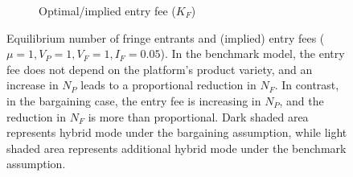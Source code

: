 \begin{figure}
\begin{subfigure}[b]{0.45\textwidth}
        \caption{Optimal/implied entry fee ($K_F$)}
        \label{fig:entry_fee}
    \end{subfigure}
    \caption{Equilibrium number of fringe entrants and (implied) entry fees ($\mu = 1, V_P = 1, V_F = 1, I_F = 0.05$). In the benchmark model, the entry fee does not depend on the platform's product variety, and an increase in $N_P$ leads to a proportional reduction in $N_F$. In contrast, in the bargaining case, the entry fee is increasing in $N_P$, and the reduction in $N_F$ is more than proportional. Dark shaded area represents hybrid mode under the bargaining assumption, while light shaded area represents additional hybrid mode under the benchmark assumption.}
    \label{fig:entry_and_fees}
\end{figure}


